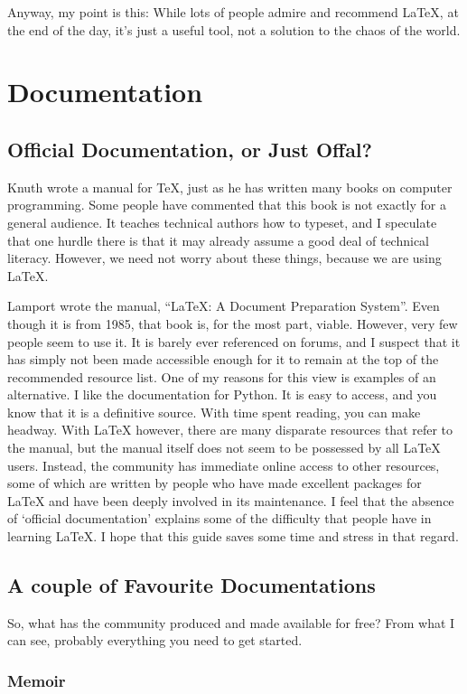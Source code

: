 \documentclass[11pt, oneside]{memoir}
\begin{document}
Anyway, my point is this: While lots of people admire and recommend LaTeX, at the end of the day, it's just a useful tool, not a solution to the chaos of the world.

\chapter{Documentation}
\section{Official Documentation, or Just Offal?}

Knuth wrote a manual for TeX, just as he has written many books on computer programming. Some people have commented that this book is not exactly for a general audience. It teaches technical authors how to typeset, and I speculate that one hurdle there is that it may already assume a good deal of technical literacy. However, we need not worry about these things, because we are using LaTeX.

Lamport wrote the manual, ``LaTeX: A Document Preparation System''. Even though it is from 1985, that book is, for the most part, viable. However, very few people seem to use it. It is barely ever referenced on forums, and I suspect that it has simply not been made accessible enough for it to remain at the top of the recommended resource list. One of my reasons for this view is examples of an alternative. I like the documentation for Python. It is easy to access, and you know that it is a definitive source. With time spent reading, you can make headway. With LaTeX however, there are many disparate resources that refer to the manual, but the manual itself does not seem to be possessed by all LaTeX users. Instead, the community has immediate online access to other resources, some of which are written by people who have made excellent packages for LaTeX and have been deeply involved in its maintenance. I feel that the absence of `official documentation' explains some of the difficulty that people have in learning LaTeX. I hope that this guide saves some time and stress in that regard.

\section{A couple of Favourite Documentations}
So, what has the community produced and made available for free? From what I can see, probably everything you need to get started.

\subsection{Memoir}
\end{document}
